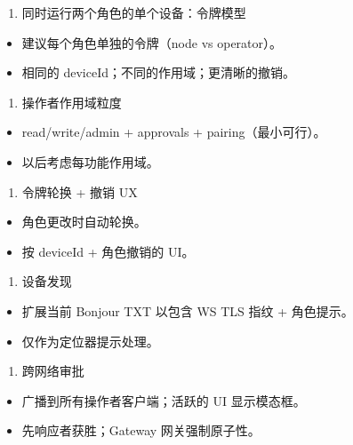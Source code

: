 \begin{enumerate}
  \item 同时运行两个角色的单个设备：令牌模型
\end{enumerate}

\begin{itemize}
  \item 建议每个角色单独的令牌（node vs operator）。
  \item 相同的 deviceId；不同的作用域；更清晰的撤销。
\end{itemize}


\begin{enumerate}
  \item 操作者作用域粒度
\end{enumerate}

\begin{itemize}
  \item read/write/admin + approvals + pairing（最小可行）。
  \item 以后考虑每功能作用域。
\end{itemize}


\begin{enumerate}
  \item 令牌轮换 + 撤销 UX
\end{enumerate}

\begin{itemize}
  \item 角色更改时自动轮换。
  \item 按 deviceId + 角色撤销的 UI。
\end{itemize}


\begin{enumerate}
  \item 设备发现
\end{enumerate}

\begin{itemize}
  \item 扩展当前 Bonjour TXT 以包含 WS TLS 指纹 + 角色提示。
  \item 仅作为定位器提示处理。
\end{itemize}


\begin{enumerate}
  \item 跨网络审批
\end{enumerate}

\begin{itemize}
  \item 广播到所有操作者客户端；活跃的 UI 显示模态框。
  \item 先响应者获胜；Gateway 网关强制原子性。
\end{itemize}



